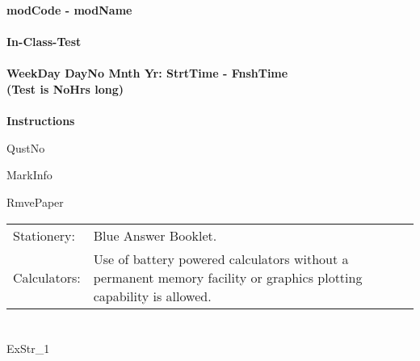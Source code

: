 \documentclass[a4paper, leqno, 12pt]{article} %
\newenvironment{top_enumerate}{
\begin{enumerate}
  \setlength{\itemsep}{2em}
  \setlength{\topsep}{-0pt}
  \setlength{\partopsep}{-0pt}
}{\end{enumerate}}
\newcommand\T{\rule{0pt}{2.6ex}}
\newcommand\B{\rule[-1.2ex]{0pt}{0pt}}
\begin{document}
\chead{}            %
\singlespacing

\begin{center}
\textbf{
modCode - modName
\\
\quad
\\
In-Class-Test
\\
\quad
\\
WeekDay DayNo Mnth Yr: StrtTime - FnshTime
\\
(Test is NoHrs long)
\\
\quad
\\
Instructions}
\end{center}

\singlespacing
\noindent
QustNo

\medskip
\noindent
MarkInfo

\medskip
\noindent
RmvePaper

\bigskip
\noindent
\begin{tabular}{l L{13cm}}
\T\B  Stationery: &	Blue Answer Booklet.\\
\T\B  Calculators: &	Use of battery powered calculators without a permanent memory facility or graphics plotting capability is allowed.\\
\end{tabular}

\newpage
\chead{\thepage}            %
\rfoot{}                %



\section*{}

\begin{top_enumerate}

ExStr_1

\end{top_enumerate}
\end{document}
